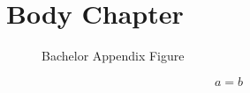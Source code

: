 \documentclass[degree=bachelor, fontset=fandol]{nwputhesis}
\begin{document}
\START
\showoutput

\frontmatter
\mainmatter
\chapter{Body Chapter}

\begin{thesisappendix}
\makeatletter
{}
\makeatother

\begin{figure}[htbp]
    \caption{Bachelor Appendix Figure}
\end{figure}

\begin{table}[htbp]
    \caption{Bachelor Appendix Table}
\end{table}

\begin{algorithm}[htbp]
    \caption{Bachelor Appendix Algorithm}
\end{algorithm}

\begin{equation}
    a=b
\end{equation}
\end{thesisappendix}

\clearpage
\OMIT
\end{document}

